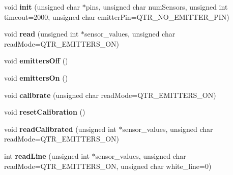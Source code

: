 \begin{DoxyCompactItemize}
\mbox{\label{class_q_t_r_sensors_r_c_a354e7064c224b6fb363405016cdf73fa}} 
void {\bfseries init} (unsigned char $\ast$pins, unsigned char num\+Sensors, unsigned int timeout=2000, unsigned char emitter\+Pin=Q\+T\+R\+\_\+\+N\+O\+\_\+\+E\+M\+I\+T\+T\+E\+R\+\_\+\+P\+IN)
\item 
\mbox{\label{class_q_t_r_sensors_afc47e6c2608293a610e1a3acce93628b}} 
void {\bfseries read} (unsigned int $\ast$sensor\+\_\+values, unsigned char read\+Mode=Q\+T\+R\+\_\+\+E\+M\+I\+T\+T\+E\+R\+S\+\_\+\+ON)
\item 
\mbox{\label{class_q_t_r_sensors_a576f1fe1e9f2d3d2097baf79a9655134}} 
void {\bfseries emitters\+Off} ()
\item 
\mbox{\label{class_q_t_r_sensors_a79f5380ecdb324a7800a045c3506975f}} 
void {\bfseries emitters\+On} ()
\item 
\mbox{\label{class_q_t_r_sensors_ac9840e2429c7a962977057ba154c77da}} 
void {\bfseries calibrate} (unsigned char read\+Mode=Q\+T\+R\+\_\+\+E\+M\+I\+T\+T\+E\+R\+S\+\_\+\+ON)
\item 
\mbox{\label{class_q_t_r_sensors_aa840b6ef17562d41edf21ddd08e0672e}} 
void {\bfseries reset\+Calibration} ()
\item 
\mbox{\label{class_q_t_r_sensors_aa32a448ac03cd2a45d1f14f96ac4b739}} 
void {\bfseries read\+Calibrated} (unsigned int $\ast$sensor\+\_\+values, unsigned char read\+Mode=Q\+T\+R\+\_\+\+E\+M\+I\+T\+T\+E\+R\+S\+\_\+\+ON)
\item 
\mbox{\label{class_q_t_r_sensors_ac84f0b98bceae0b59d687ae82eb92718}} 
int {\bfseries read\+Line} (unsigned int $\ast$sensor\+\_\+values, unsigned char read\+Mode=Q\+T\+R\+\_\+\+E\+M\+I\+T\+T\+E\+R\+S\+\_\+\+ON, unsigned char white\+\_\+line=0)
\end{DoxyCompactItemize}
